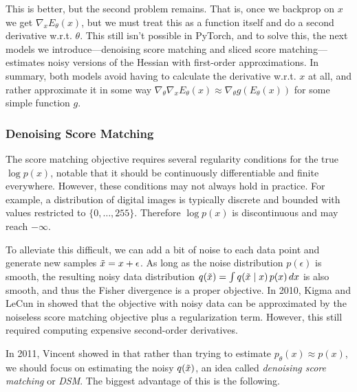     This is better, but the second problem remains. That is, once we backprop on $x$ we get $\nabla_x E_\theta (x)$, but we must treat this as a function itself and do a second derivative w.r.t. $\theta$. This still isn't possible in PyTorch, and to solve this, the next models we introduce---denoising score matching and sliced score matching---estimates noisy versions of the Hessian with first-order approximations. In summary, both models avoid having to calculate the derivative w.r.t. $x$ at all, and rather approximate it in some way $\nabla_\theta \nabla_x E_\theta (x) \approx \nabla_\theta g(E_\theta(x))$ for some simple function $g$. 

  \subsubsection{Denoising Score Matching} 

    The score matching objective requires several regularity conditions for the true $\log p(x)$, notable that it should be continuously differentiable and finite everywhere. However, these conditions may not always hold in practice. For example, a distribution of digital images is typically discrete and bounded with values restricted to $\{0, \ldots, 255\}$. Therefore $\log p(x)$ is discontinuous and may reach $-\infty$. 

    To alleviate this difficult, we can add a bit of noise to each data point and generate new samples $\Tilde{x} = x + \epsilon$. As long as the noise distribution $p(\epsilon)$ is smooth, the resulting noisy data distribution $q(\Tilde{x}) = \int q(\Tilde{x} \mid x) \, p(x) \,dx$ is also smooth, and thus the Fisher divergence is a proper objective. In 2010, Kigma and LeCun in \cite{reg_score} showed that the objective with noisy data can be approximated by the noiseless score matching objective plus a regularization term. However, this still required computing expensive second-order derivatives. 

    In 2011, Vincent showed in \cite{denoise_score} that rather than trying to estimate $p_\theta (x) \approx p(x)$, we should focus on estimating the noisy $q(\Tilde{x})$, an idea called \textit{denoising score matching} or \textit{DSM}. The biggest advantage of this is the following. 

